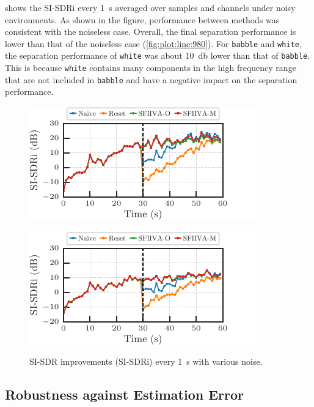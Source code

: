 \documentclass[sip,biber]{now-journal}
\begin{document}
 shows the SI-SDRi every \SI{1}{\second} averaged over samples and channels under noisy environments.
As shown in the figure, performance between methods was consistent with the noiseless case.
Overall, the final separation performance is lower than that of the noiseless case (\cref{fig:plot:line:980}).
For \texttt{babble} and \texttt{white}, the separation performance of \texttt{white} was about \SI{10}{\decibel} lower than that of \texttt{babble}.
This is because \texttt{white} contains many components in the high frequency range that are not included in \texttt{babble} and have a negative impact on the separation performance.
\begin{figure}[t]
  \centering
  \begin{minipage}[t]{.45\textwidth}
    \centering\includegraphics{figures/plots/babble-norm/line_980.pdf}\label{fig:plot:line:980:babble}
  \end{minipage}
  \hspace{.05\textwidth}
  \begin{minipage}[t]{.45\textwidth}
    \centering\includegraphics{figures/plots/white-norm/line_980.pdf}\label{fig:plot:line:980:white}
  \end{minipage}
  \caption{SI-SDR improvements (SI-SDRi) every \SI{1}{\second} with various noise.}%
  \label{fig:plot:line:noise}
\end{figure}

\subsection{Robustness against Estimation Error}
\end{document}
